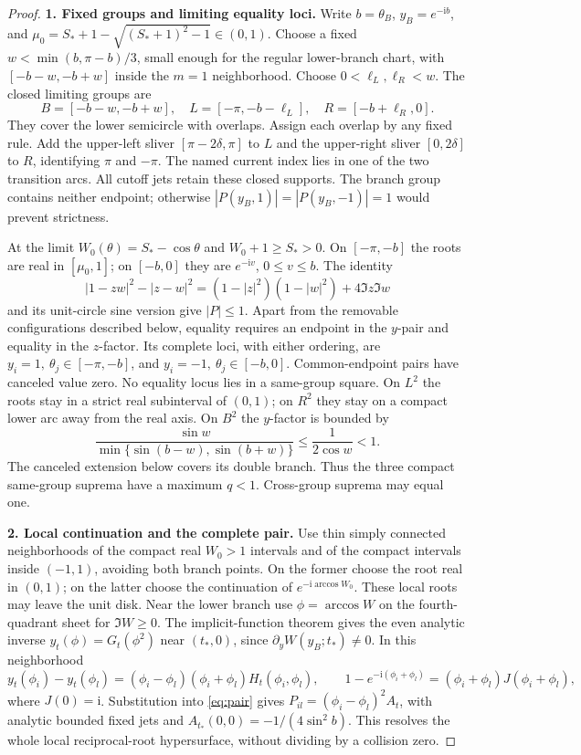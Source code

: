 \documentclass[11pt]{article}
\numberwithin{equation}{section}
\theoremstyle{definition}
\newcommand{\ii}{\mathrm i}
\begin{document}
\begin{proof}
\noindent\textbf{1. Fixed groups and limiting equality loci.}
Write \(b=\theta_B\), \(y_B=e^{-\ii b}\), and
\(\mu_0=S_*+1-\sqrt{(S_*+1)^2-1}\in(0,1)\).
Choose a fixed \(w<\min(b,\pi-b)/3\), small enough for the
regular lower-branch chart, with \([-b-w,-b+w]\) inside the
\(m=1\) neighborhood. Choose \(0<\ell_L,\ell_R<w\).
The closed limiting groups are
\[
 B=[-b-w,-b+w],\quad L=[-\pi,-b-\ell_L],\quad
 R=[-b+\ell_R,0].
\]
They cover the lower semicircle with overlaps. Assign each overlap
by any fixed rule. Add the upper-left sliver \([\pi-2\delta,\pi]\)
to \(L\) and the upper-right sliver \([0,2\delta]\) to \(R\),
identifying \(\pi\) and \(-\pi\). The named current index lies
in one of the two transition arcs. All cutoff jets retain these
closed supports. The branch group contains neither endpoint;
otherwise \(|P(y_B,1)|=|P(y_B,-1)|=1\) would prevent strictness.

At the limit \(W_0(\theta)=S_*-\cos\theta\) and
\(W_0+1\ge S_*>0\). On \([-\pi,-b]\) the roots are real
in \([\mu_0,1]\); on \([-b,0]\) they are \(e^{-\ii v}\),
\(0\le v\le b\). The identity
\[
 |1-zw|^2-|z-w|^2
 =(1-|z|^2)(1-|w|^2)+4\Im z\Im w
\]
and its unit-circle sine version give \(|P|\le1\).
Apart from the removable configurations described below, equality
requires an endpoint in the \(y\)-pair and equality in the
\(z\)-factor. Its complete loci, with either ordering, are
\(y_i=1,\ \theta_j\in[-\pi,-b]\), and
\(y_i=-1,\ \theta_j\in[-b,0]\). Common-endpoint pairs have
canceled value zero. No equality locus lies in a same-group square.
On \(L^2\) the roots stay in a strict real subinterval of \((0,1)\);
on \(R^2\) they stay on a compact lower arc away from the real axis.
On \(B^2\) the \(y\)-factor is bounded by
\[
 \frac{\sin w}{\min\{\sin(b-w),\sin(b+w)\}}
 \le\frac1{2\cos w}<1.
\]
The canceled extension below covers its double branch. Thus
the three compact same-group suprema have a maximum \(q<1\).
Cross-group suprema may equal one.

\par\smallskip\noindent\textbf{2. Local continuation and the complete pair.}
Use thin simply connected neighborhoods of the compact real
\(W_0>1\) intervals and of the compact intervals inside \((-1,1)\),
avoiding both branch points. On the former choose the root real
in \((0,1)\); on the latter choose the continuation of
\(e^{-\ii\arccos W_0}\). These local roots may leave the unit disk.
Near the lower branch use \(\phi=\arccos W\) on the
fourth-quadrant sheet for \(\Im W\ge0\).
The implicit-function theorem gives the even analytic inverse
\(y_t(\phi)=G_t(\phi^2)\) near \((t_*,0)\), since
\(\partial_yW(y_B;t_*)\ne0\). In this neighborhood
\[
 y_t(\phi_i)-y_t(\phi_l)
  =(\phi_i-\phi_l)(\phi_i+\phi_l)H_t(\phi_i,\phi_l),\qquad
 1-e^{-\ii(\phi_i+\phi_l)}=(\phi_i+\phi_l)J(\phi_i+\phi_l),
\]
where \(J(0)=\ii\). Substitution into \eqref{eq:pair} gives
\(P_{il}=(\phi_i-\phi_l)^2A_t\), with analytic bounded fixed
jets and \(A_{t_*}(0,0)=-1/(4\sin^2b)\).
This resolves the whole local reciprocal-root hypersurface,
without dividing by a collision zero.


\end{proof}
\end{document}
